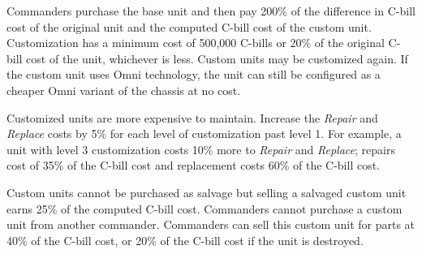 Commanders purchase the base unit and then pay 200\% of the difference in C-bill cost of the original unit and the computed C-bill cost of the custom unit.
Customization has a minimum cost of 500,000 C-bills or 20\% of the original C-bill cost of the unit, whichever is less.
Custom units may be customized again.
If the custom unit uses Omni technology, the unit can still be configured as a cheaper Omni variant of the chassis at no cost.

Customized units are more expensive to maintain.
Increase the \emph{Repair} and \emph{Replace} costs by 5\% for each level of customization past level 1.
For example, a unit with level 3 customization costs 10\% more to \emph{Repair} and \emph{Replace}; repairs cost of 35\% of the C-bill cost and replacement costs 60\% of the C-bill cost.

Custom units cannot be purchased as salvage but selling a salvaged custom unit earns 25\% of the computed C-bill cost.
Commanders cannot purchase a custom unit from another commander.
Commanders can sell this custom unit for parts at 40\% of the C-bill cost, or 20\% of the C-bill cost if the unit is destroyed.

